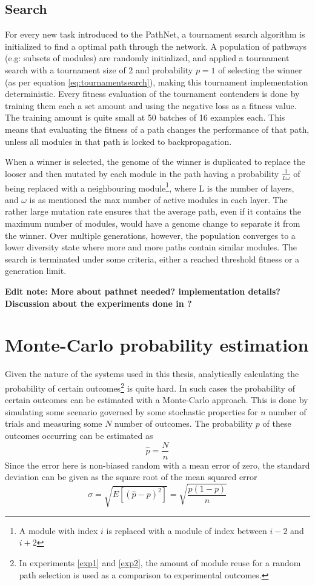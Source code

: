 \subsection{Search}
For every new task introduced to the PathNet, a tournament search algorithm is initialized to find a optimal path through the network. A population of pathways (e.g: subsets of modules) are randomly initialized, and applied a tournament search with a tournament size of 2 and probability \(p=1\) of selecting the winner (as per equation \ref{eq:tournamentsearch}), making this tournament implementation deterministic. Every fitness evaluation of the tournament contenders is done by training them each a set amount and using the negative loss as a fitness value. The training amount is quite small at 50 batches of 16 examples each. This means that evaluating the fitness of a path changes the performance of that path, unless all modules in that path is locked to backpropagation.

When a winner is selected, the genome of the winner is duplicated to replace the looser and then mutated by each module in the path having a probability \(\frac{1}{L\omega}\) of being replaced with a neighbouring module\footnote{A module with index \(i\) is replaced with a module of index between \(i-2\) and \(i+2\)}, where L is the number of layers, and \(\omega\) is as mentioned the max number of active modules in each layer. The rather large mutation rate ensures that the average path, even if it contains the maximum number of modules, would have a genome change to separate it from the winner. Over multiple generations, however, the population converges to a lower diversity state where more and more paths contain similar modules. The search is terminated under some criteria, either a reached threshold fitness or a generation limit. 

\textbf{Edit note: More about pathnet needed? implementation details? Discussion about the experiments done in \cite{pathnet}?}

\section{Monte-Carlo probability estimation}
Given the nature of the systems used in this thesis, analytically calculating the probability of certain outcomes\footnote{In experiments \ref{exp1} and \ref{exp2}, the amount of module reuse for a random path selection is used as a comparison to experimental outcomes.} is quite hard. In such cases the probability of certain outcomes can be estimated with a Monte-Carlo approach. This is done by simulating some scenario governed by some stochastic properties for \(n\) number of trials and measuring some \(N\) number of outcomes. The probability \(p\) of these outcomes occurring can be estimated as 
\begin{equation*}
    \hat{p}=\frac{N}{n}
\end{equation*}
Since the error here is non-biased random with a mean error of zero, the standard deviation can be given as the square root of the mean squared error 
\begin{equation*}
    \sigma=\sqrt{E[(\hat{p}-p)^{2}]} =\sqrt{\frac{p(1-p)}{n}}
\end{equation*}


